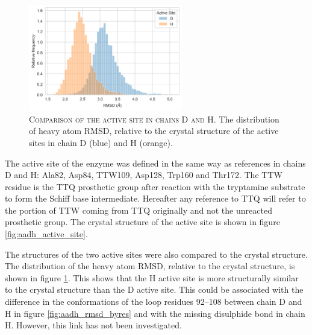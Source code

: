 \begin{figure}
    \centering
    \includegraphics[width=0.6\textwidth]{chapters/aadh/figures/rmsd_dististribution.png}
    \caption[Comparison of the active site in chains D and H]{\textsc{Comparison of the active site in chains D and H}. The distribution of heavy atom RMSD, relative to the crystal structure of the active sites in chain D (blue) and H (orange).}
    \label{fig:as_rmsd_dist}
\end{figure}

The active site of the enzyme was defined in the same way as references  \cite{ranaghanInitioQMMM2017, masgrauAtomicDescriptionEnzyme2006, masgrauTunnelingClassicalPaths2007} in chains D and H: Ala82, Asp84, TTW109, Asp128, Trp160 and Thr172. The TTW residue is the TTQ prosthetic group after reaction with the tryptamine substrate to form the Schiff base intermediate. Hereafter any reference to TTQ will refer to the portion of TTW coming from TTQ originally and not the unreacted prosthetic group. The crystal structure of the active site is shown in figure \ref{fig:aadh_active_site}. 

The structures of the two active sites were also compared to the crystal structure. The distribution of the heavy atom RMSD, relative to the crystal structure, is shown in figure \ref{fig:as_rmsd_dist}. This shows that the H active site is more structurally similar to the crystal structure than the D active site. This could be associated with the difference in the conformations of the loop residues \numrange[range-phrase=\text{--}]{92}{108} between chain D and H in figure \ref{fig:aadh_rmsd_byres} and with the missing disulphide bond in chain H. However, this link has not been investigated. 

